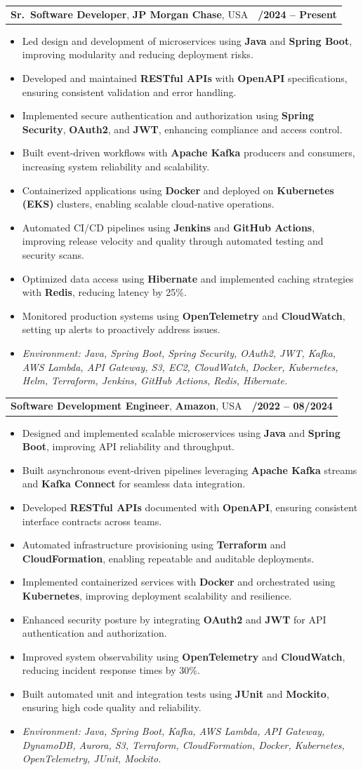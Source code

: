 \documentclass[letterpaper,11pt]{article}
\makeatletter
\newcommand{\resumeItem}[1]{
  \item\footnotesize{
    {#1 \vspace{-2pt}}
  }
}
\newcommand{\resumeSubheading}[4]{
  \vspace{-2pt}\item
    \begin{tabular*}{1.0\textwidth}[t]{l@{\extracolsep{\fill}}r}
      \textbf{\fontsize{10pt}{14pt}\selectfont #3}, \textbf{\fontsize{10pt}{14pt}\selectfont #1}, \fontsize{10pt}{14pt}\selectfont #4 & \textbf{\fontsize{10pt}{14pt}\selectfont #2} \\
    \end{tabular*}\vspace{-7pt}
}
\newcommand{\resumeItemListStart}{\begin{itemize}[leftmargin=*]}
\newcommand{\resumeItemListEnd}{\end{itemize}\vspace{-5pt}}
\makeatother
\begin{document}
\resumeSubheading
{JP Morgan Chase}{09/2024 -- Present}
{Sr.\ Software Developer}{USA}
\resumeItemListStart
  \resumeItem{Led design and development of microservices using \textbf{Java} and \textbf{Spring Boot}, improving modularity and reducing deployment risks.}
  \resumeItem{Developed and maintained \textbf{RESTful APIs} with \textbf{OpenAPI} specifications, ensuring consistent validation and error handling.}
  \resumeItem{Implemented secure authentication and authorization using \textbf{Spring Security}, \textbf{OAuth2}, and \textbf{JWT}, enhancing compliance and access control.}
  \resumeItem{Built event-driven workflows with \textbf{Apache Kafka} producers and consumers, increasing system reliability and scalability.}
  \resumeItem{Containerized applications using \textbf{Docker} and deployed on \textbf{Kubernetes (EKS)} clusters, enabling scalable cloud-native operations.}
  \resumeItem{Automated CI/CD pipelines using \textbf{Jenkins} and \textbf{GitHub Actions}, improving release velocity and quality through automated testing and security scans.}
  \resumeItem{Optimized data access using \textbf{Hibernate} and implemented caching strategies with \textbf{Redis}, reducing latency by 25\%.}
  \resumeItem{Monitored production systems using \textbf{OpenTelemetry} and \textbf{CloudWatch}, setting up alerts to proactively address issues.}
  \resumeItem{\textit{Environment: Java, Spring Boot, Spring Security, OAuth2, JWT, Kafka, AWS Lambda, API Gateway, S3, EC2, CloudWatch, Docker, Kubernetes, Helm, Terraform, Jenkins, GitHub Actions, Redis, Hibernate.}}
\resumeItemListEnd

\resumeSubheading
{Amazon}{10/2022 -- 08/2024}
{Software Development Engineer}{USA}
\resumeItemListStart
  \resumeItem{Designed and implemented scalable microservices using \textbf{Java} and \textbf{Spring Boot}, improving API reliability and throughput.}
  \resumeItem{Built asynchronous event-driven pipelines leveraging \textbf{Apache Kafka} streams and \textbf{Kafka Connect} for seamless data integration.}
  \resumeItem{Developed \textbf{RESTful APIs} documented with \textbf{OpenAPI}, ensuring consistent interface contracts across teams.}
  \resumeItem{Automated infrastructure provisioning using \textbf{Terraform} and \textbf{CloudFormation}, enabling repeatable and auditable deployments.}
  \resumeItem{Implemented containerized services with \textbf{Docker} and orchestrated using \textbf{Kubernetes}, improving deployment scalability and resilience.}
  \resumeItem{Enhanced security posture by integrating \textbf{OAuth2} and \textbf{JWT} for API authentication and authorization.}
  \resumeItem{Improved system observability using \textbf{OpenTelemetry} and \textbf{CloudWatch}, reducing incident response times by 30\%.}
  \resumeItem{Built automated unit and integration tests using \textbf{JUnit} and \textbf{Mockito}, ensuring high code quality and reliability.}
  \resumeItem{\textit{Environment: Java, Spring Boot, Kafka, AWS Lambda, API Gateway, DynamoDB, Aurora, S3, Terraform, CloudFormation, Docker, Kubernetes, OpenTelemetry, JUnit, Mockito.}}
\resumeItemListEnd
\end{document}

